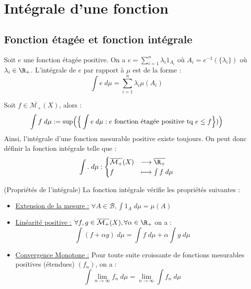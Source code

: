\minitoc  %


\section{Intégrale d'une fonction}

\subsection{Fonction étagée et fonction intégrale}

\begin{definition}
    Soit $e$ une fonction étagée positive. On a $e = \sum_{i=1}^{n} \lambda_i 1_{A_i}$ où $A_i = e^{-1}(\{\lambda_i\})$ où $\lambda_i \in \R_+$.
    L'intégrale de $e$ par rapport à $\mu$ est de la forme :
        \[ \boxed{ \int e \; d \mu = \sum_{i=1}^{n} \lambda_i \mu (A_i) } \] 
\end{definition}

\begin{definition}
    Soit $f \in \overline{\mathcal{M}_+}(X)$, alors : 
        \[ \int f \; d \mu := \sup \Bigl( \Bigr\{ \int e \; d \mu : e \text{ fonction étagée positive tq } e \leq f \Bigl\}) \Bigr) \] 
    Ainsi, l'intégrale d'une fonction mesurable positive existe toujours.
    On peut donc définir la fonction intégrale telle que :
        \[ \int . \; d \mu : 
            \begin{cases}
                \overline{\mathcal{M}_+}(X) & \longrightarrow \overline{\R_+} \\ 
                f & \longmapsto \int f \; d \mu 
            \end{cases}
        \] 
\end{definition}

\begin{prop}(Propriétés de l'intégrale)
    La fonction intégrale vérifie les propriétés suivantes :
    \begin{itemize}
        \item \underline{Extension de la mesure :} $\forall A \in \mathcal{B}, \int 1 _A \; d \mu = \mu(A)$ 
        \item \underline{Linéarité positive :} $\forall f, g \in \overline{\mathcal{M}_+}(X), \forall \alpha \in \R_+$ on a :
            \[ \int (f + \alpha g) \; d \mu = \int f \; d \mu + \alpha \int g \; d \mu \]
        \item \underline{Convergence Monotone :} Pour toute suite croissante de fonctions mesurables positives (étendues) $(f_n)$, on a :
            \[ \boxed { \int \lim_{n\to\infty} f_n \; d \mu = \lim_{n\to\infty} \int f_n \; d \mu }\] 
    \end{itemize}
\end{prop}

